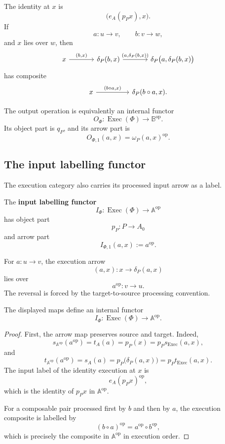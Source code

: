The identity at \(x\) is
\[
    \bigl(e_A(p_Px),x\bigr).
\]
If
\[
    a:u\to v,
    \qquad
    b:v\to w,
\]
and \(x\) lies over \(w\), then
\[
\begin{tikzcd}[column sep=large]
    x
        \arrow[r, "{(b,x)}"]
    &
    \delta_P(b,x)
        \arrow[r, "{(a,\delta_P(b,x))}"]
    &
    \delta_P\bigl(a,\delta_P(b,x)\bigr)
\end{tikzcd}
\]
has composite
\[
\begin{tikzcd}[column sep=huge]
    x
        \arrow[r, "{(b\circ a,x)}"]
    &
    \delta_P(b\circ a,x).
\end{tikzcd}
\]

The output operation is equivalently an internal functor
\[
    O_\Phi:
    \operatorname{Exec}(\Phi)
    \longrightarrow
    \mathbb B^{\mathrm{op}}.
\]
Its object part is \(q_P\), and its arrow part is
\[
    O_{\Phi,1}(a,x)
    =
    \omega_P(a,x)^{\mathrm{op}}.
\]

\subsection{The input labelling functor}
\label{subsec:input-labelling-functor}

The execution category also carries its processed input arrow as a label.

\begin{definition}
\label{def:input-labelling-functor}
The \textbf{input labelling functor}
\[
    I_\Phi:
    \operatorname{Exec}(\Phi)
    \longrightarrow
    \mathbb A^{\mathrm{op}}
\]
has object part
\[
    p_P:P\to A_0
\]
and arrow part
\[
    I_{\Phi,1}(a,x):=a^{\mathrm{op}}.
\]
\end{definition}

For \(a:u\to v\), the execution arrow
\[
    (a,x):x\to\delta_P(a,x)
\]
lies over
\[
    a^{\mathrm{op}}:v\to u.
\]
The reversal is forced by the target-to-source processing convention.

\begin{proposition}
\label{prop:functoriality-input-label}
The displayed maps define an internal functor
\[
    I_\Phi:
    \operatorname{Exec}(\Phi)\to\mathbb A^{\mathrm{op}}.
\]
\end{proposition}

\begin{proof}
First, the arrow map preserves source and target. Indeed,
\[
    s_{\mathbb A^{\mathrm{op}}}(a^{\mathrm{op}})
    =
    t_A(a)
    =
    p_P(x)
    =
    p_Ps_{\operatorname{Exec}}(a,x),
\]
and
\[
    t_{\mathbb A^{\mathrm{op}}}(a^{\mathrm{op}})
    =
    s_A(a)
    =
    p_P\bigl(\delta_P(a,x)\bigr)
    =
    p_Pt_{\operatorname{Exec}}(a,x).
\]
The input label of the identity execution at \(x\) is
\[
    e_A(p_Px)^{\mathrm{op}},
\]
which is the identity of \(p_Px\) in
\(\mathbb A^{\mathrm{op}}\).

For a composable pair processed first by \(b\) and then by \(a\), the
execution composite is labelled by
\[
    (b\circ a)^{\mathrm{op}}
    =
    a^{\mathrm{op}}\circ b^{\mathrm{op}},
\]
which is precisely the composite in
\(\mathbb A^{\mathrm{op}}\) in execution order.
\end{proof}

